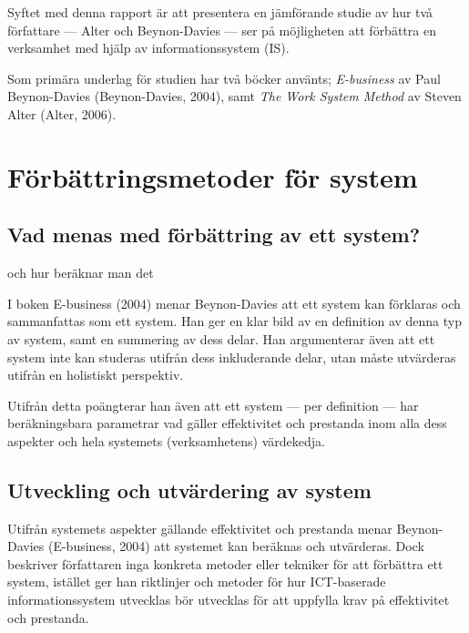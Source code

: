 \documentclass[12pt,a4paper,titlepage]{article}
\begin{document}
Syftet med denna rapport är att presentera en jämförande studie av hur två författare --- Alter och Beynon-Davies --- ser på möjligheten att förbättra en verksamhet med hjälp av informationssystem (IS).

Som primära underlag för studien har två böcker använts; \textit{E-business} av Paul Beynon-Davies (Beynon-Davies, 2004), samt \textit{The Work System Method} av Steven Alter (Alter, 2006).

\section{\textsf{Förbättringsmetoder för system}}
\subsection{\textsf{Vad menas med förbättring av ett system?}}
och hur beräknar man det

I boken E-business (2004) menar Beynon-Davies att ett system kan förklaras och sammanfattas som ett system. Han ger en klar bild av en definition av denna typ av system, samt en summering av dess delar. Han argumenterar även att ett system inte kan studeras utifrån dess inkluderande delar, utan måste utvärderas utifrån en holistiskt perspektiv.

Utifrån detta poängterar han även att ett system --- per definition --- har beräkningsbara parametrar vad gäller effektivitet och prestanda inom alla dess aspekter och hela systemets (verksamhetens) värdekedja.

\subsection{\textsf{Utveckling och utvärdering av system}}
Utifrån systemets aspekter gällande effektivitet och prestanda menar Beynon-Davies (E-business, 2004) att systemet kan beräknas och utvärderas. Dock beskriver författaren inga konkreta metoder eller tekniker för att förbättra ett system, istället ger han riktlinjer och metoder för hur ICT-baserade informationssystem utvecklas bör utvecklas för att uppfylla krav på effektivitet och prestanda.
\end{document}
